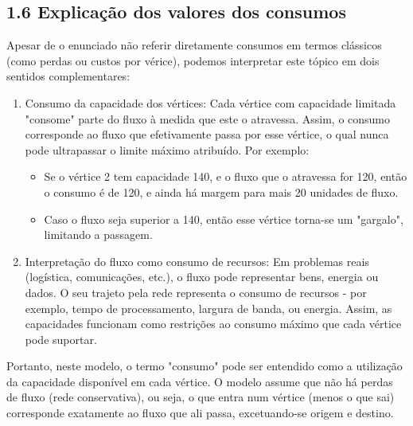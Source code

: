 \documentclass[a4paper,12pt]{article}
\begin{document}
\subsection*{1.6 Explicação dos valores dos consumos}
Apesar de o enunciado não referir diretamente consumos em termos clássicos (como perdas ou custos por vérice), podemos interpretar este tópico em dois sentidos complementares:
\begin{enumerate}
    \item Consumo da capacidade dos vértices: Cada vértice com capacidade limitada "consome" parte do fluxo à medida que este o atravessa. Assim, o consumo corresponde ao fluxo que efetivamente passa por esse vértice, o qual nunca pode ultrapassar o limite máximo atribuído. Por exemplo:
    \begin{itemize}
        \item Se o vértice 2 tem capacidade 140, e o fluxo que o atravessa for 120, então o consumo é de 120, e ainda há margem para mais 20 unidades de fluxo.
        \item Caso o fluxo seja superior a 140, então esse vértice torna-se um "gargalo", limitando a passagem.
    \end{itemize}
    \item Interpretação do fluxo como consumo de recursos: Em problemas reais (logística, comunicações, etc.), o fluxo pode representar bens, energia ou dados. O seu trajeto pela rede representa o consumo de recursos - por exemplo, tempo de processamento, largura de banda, ou energia. Assim, as capacidades funcionam como restrições ao consumo máximo que cada vértice pode suportar.
\end{enumerate}
Portanto, neste modelo, o termo "consumo" pode ser entendido como a utilização da capacidade disponível em cada vértice. O modelo assume que não há perdas de fluxo (rede conservativa), ou seja, o que entra num vértice (menos o que sai) corresponde exatamente ao fluxo que ali passa, excetuando-se origem e destino.
\end{document}
